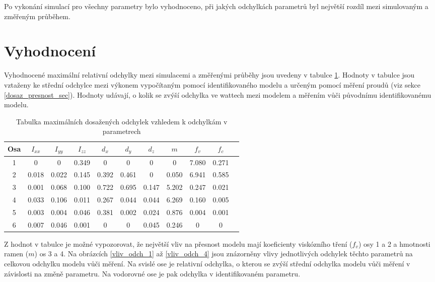 Po vykonání simulací pro všechny parametry bylo vyhodnoceno, při jakých odchylkách parametrů byl největší rozdíl mezi simulovaným a změřeným průběhem. 

\section{Vyhodnocení}

Vyhodnocené maximální relativní odchylky mezi simulacemi a změřenými průběhy jsou uvedeny v tabulce \ref{tab_odch_parametru}. Hodnoty v tabulce jsou vztaženy ke střední odchylce mezi výkonem vypočítaným pomocí identifikovaného modelu a určeným pomocí měření proudů (viz sekce \ref{dosaz_presnost_sec}). Hodnoty udávají, o kolik se zvýší odchylka ve wattech mezi modelem a měřením vůči původnímu identifikovanému modelu.

\begin{table}[htbp]
  \centering
  \caption{Tabulka maximálních dosažených odchylek vzhledem k odchylkám v parametrech}
    \begin{tabular}{c|cccccccccc}
    \multicolumn{1}{c|}{Osa} & \multicolumn{1}{c}{$I_{xx}$} & \multicolumn{1}{c}{$I_{yy}$} & \multicolumn{1}{c}{$I_{zz}$} & \multicolumn{1}{c}{$d_x$} & \multicolumn{1}{c}{$d_y$} & \multicolumn{1}{c}{$d_z$} & \multicolumn{1}{c}{$m$} & \multicolumn{1}{c}{$f_v$} & \multicolumn{1}{c}{$f_c$} \\
    \hline
    1  & 0     & 0     & 0.349 & 0     & 0     & 0     & 0     &  7.080 & 0.271 \\
    2  & 0.018 & 0.022 & 0.145 & 0.392 & 0.461 & 0     & 0.050 &  6.941 & 0.585 \\
    3  & 0.001 & 0.068 & 0.100 & 0.722 & 0.695 & 0.147 & 5.202 &  0.247 & 0.021 \\
    4  & 0.033 & 0.106 & 0.011 & 0.267 & 0.044 & 0.044 & 6.269 &  0.160 & 0.005 \\
    5  & 0.003 & 0.004 & 0.046 & 0.381 & 0.002 & 0.024 & 0.876 &  0.004 & 0.001 \\
    6  & 0.007 & 0.046 & 0.001 & 0     & 0     & 0.045 & 0.246 &  0     & 0     \\
    \end{tabular}%
  \label{tab_odch_parametru}%
\end{table}%

Z hodnot v tabulce je možné vypozorovat, že největší vliv na přesnost modelu mají koeficienty viskózního tření ($f_v$) osy 1 a 2 a hmotnosti ramen ($m$) os 3 a 4. Na obrázcích \ref{vliv_odch_1} až \ref{vliv_odch_4} jsou znázorněny vlivy jednotlivých odchylek těchto parametrů na celkovou odchylku modelu vůči měření. Na svislé ose je relativní odchylka, o kterou se zvýší střední odchylka modelu vůči měření v závislosti na změně parametru. Na vodorovné ose je pak odchylka v identifikovaném parametru. 

